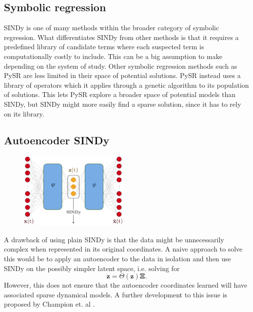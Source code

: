 \subsection{Symbolic regression}
SINDy is one of many methods within the broader category of symbolic regression. What differentiates SINDy from other methods is that it requires a predefined library of candidate terms where each suspected term is computationally costly to include. This can be a big assumption to make depending on the system of study. Other symbolic regression methods such as PySR \cite{cranmer2020discovering} are less limited in their space of potential solutions. PySR instead uses a library of operators which it applies through a genetic algorithm to its population of solutions. This lets PySR explore a broader space of potential models than SINDy, but SINDy might more easily find a sparse solution, since it has to rely on its library.

\subsection{Autoencoder SINDy}

\begin{figure}[H]
    \centering
    \includegraphics[width=0.48\textwidth]{project_2/images/autoencoder_diagram.pdf}
    \caption{}
    \label{fig:autoencoder_diagram}
\end{figure}

A drawback of using plain SINDy is that the data might be unnecessarily complex when represented in its original coordinates. A naive approach to solve this would be to apply an autoencoder to the data in isolation and then use SINDy on the possibly simpler latent space, i.e. solving for
\begin{equation}
    \dot{\mathbf{z}}=\Theta(\mathbf{z}) \boldsymbol{\Xi}.
\end{equation}
However, this does not ensure that the autoencoder coordinates learned will have associated sparse dynamical models. A further development to this issue is proposed by Champion et. al \cite{Champion_2019}. 


